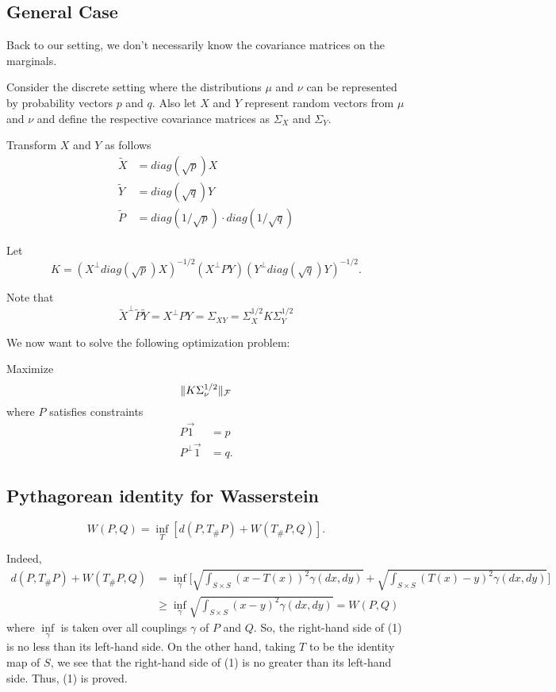 \subsection*{General Case}
Back to our setting, we don't necessarily know the covariance matrices on the marginals.

Consider the discrete setting where the distributions $\mu$ and $\nu$ can be represented by probability vectors $p$ and $q$. Also let $X$ and $Y$ represent random vectors from $\mu$ and $\nu$ and define the respective covariance matrices as $\Sigma_X$ and $\Sigma_Y$.

Transform $X$ and $Y$ as follows
\begin{align*}
	\tilde{X} &= diag(\sqrt{p})X \\
	\tilde{Y} &= diag(\sqrt{q})Y \\
	\tilde{P} &= diag(1/\sqrt{p})\cdot diag(1/\sqrt{q})
\end{align*}

Let $$K=(X^{\perp}diag(\sqrt{p})X)^{-1/2}(X^{\perp}PY)(Y^{\perp}diag(\sqrt{q})Y)^{-1/2}.$$

Note that
$$\tilde{X}^{\perp}\tilde{P}\tilde{Y}=X^{\perp}PY=\Sigma_{XY}=\Sigma_X^{1/2}K\Sigma_Y^{1/2}$$

We now want to solve the following optimization problem:

Maximize $$\lVert K\Sigma_{\nu}^{1/2}\rVert_{\mathcal{F}}$$ where
$P$ satisfies constraints 
\begin{align*}
	P\vec{1} &=p \\
	P^{\perp}\vec{1} &=q.
\end{align*}

\subsection*{Pythagorean identity for Wasserstein}

\begin{equation}
	W(P,Q)=\inf_T[d(P,T_{\#}P)+W(T_{\#}P,Q)].
\end{equation}

Indeed, 
\begin{align*}
	d(P,T_{\#}P)+W(T_{\#}P,Q)&=\inf_\gamma\Big[\sqrt{\int_{S\times S}(x-T(x))^2\gamma(dx,dy)}+\sqrt{\int_{S\times S}(T(x)-y)^2\gamma(dx,dy)}\Big] \\
	&\ge\inf_\gamma\sqrt{\int_{S\times S}(x-y)^2\gamma(dx,dy)}=W(P,Q)
\end{align*}
where $\inf\limits_\gamma$ is taken over all couplings $\gamma$ of $P$ and $Q$. So, the right-hand side of (1) is no less than its left-hand side. On the other hand, taking $T$ to be the identity map of $S$, we see that the right-hand side of (1) is no greater than its left-hand side. Thus, (1) is proved. 

